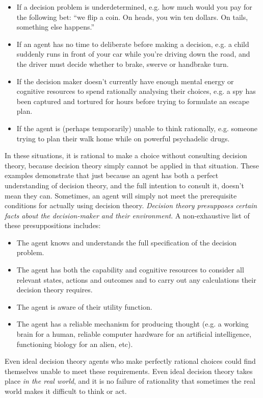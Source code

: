 \documentclass{article}
\begin{document}
\begin{itemize}  
\item If a decision problem is underdetermined, e.g. how much would you pay for the following bet: ``we flip a coin. On heads, you win ten dollars. On tails, something else happens.''
\item If an agent has no time to deliberate before making a decision, e.g. a child suddenly runs in front of your car while you're driving down the road, and the driver must decide whether to brake, swerve or handbrake turn.
\item If the decision maker doesn't currently have enough mental energy or cognitive resources to spend rationally analysing their choices, e.g. a spy has been captured and tortured for hours before trying to formulate an escape plan.
\item If the agent is (perhaps temporarily) unable to think rationally, e.g. someone trying to plan their walk home while on powerful psychadelic drugs.
\end{itemize}

In these situations, it is rational to make a choice without consulting decision theory, because decision theory simply cannot be applied in that situation. These examples demonstrate that just because an agent has both a perfect understanding of decision theory, and the full intention to consult it, doesn't mean they can. Sometimes, an agent will simply not meet the prerequisite conditions for actually using decision theory. \textit{Decision theory presupposes certain facts about the decision-maker and their environment}. A non-exhaustive list of these presuppositions includes:

\begin{itemize}  
\item The agent knows and understands the full specification of the decision problem.
\item The agent has both the capability and cognitive resources to consider all relevant states, actions and outcomes and to carry out any calculations their decision theory requires.
\item The agent is aware of their utility function.
\item The agent has a reliable mechanism for producing thought (e.g. a working brain for a human, reliable computer hardware for an artificial intelligence, functioning biology for an alien, etc).
\end{itemize}

Even ideal decision theory agents who make perfectly rational choices could find themselves unable to meet these requirements. Even ideal decision theory takes place \textit{in the real world}, and it is no failure of rationality that sometimes the real world makes it difficult to think or act.
\end{document}
